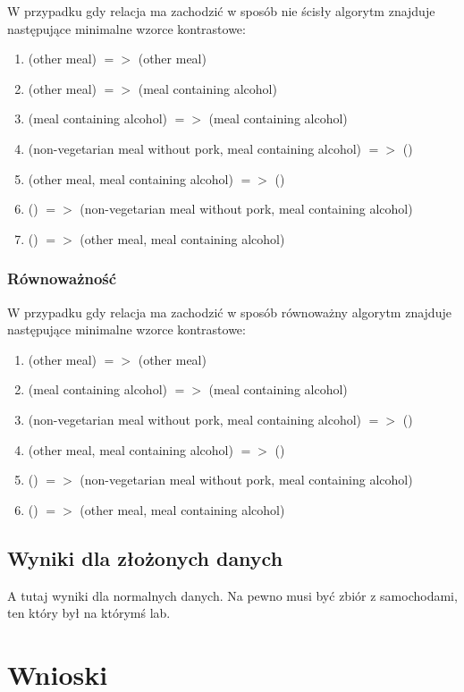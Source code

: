 \documentclass[a4paper,12pt]{article}
\begin{document}
W przypadku gdy relacja ma zachodzić w sposób nie ścisły algorytm znajduje następujące minimalne wzorce kontrastowe:

\begin{enumerate}
\item (other meal) $=>$ (other meal)
\item (other meal) $=>$ (meal containing alcohol)
\item (meal containing alcohol) $=>$ (meal containing alcohol)
\item (non-vegetarian meal without pork, meal containing alcohol) $=>$ ()
\item (other meal, meal containing alcohol) $=>$ ()
\item () $=>$ (non-vegetarian meal without pork, meal containing alcohol)
\item () $=>$ (other meal, meal containing alcohol)
\end{enumerate}

\subsubsection{Równoważność}

W przypadku gdy relacja ma zachodzić w sposób równoważny algorytm znajduje następujące minimalne wzorce kontrastowe:

\begin{enumerate}
\item (other meal) $=>$ (other meal)
\item (meal containing alcohol) $=>$ (meal containing alcohol)
\item (non-vegetarian meal without pork, meal containing alcohol) $=>$ ()
\item (other meal, meal containing alcohol) $=>$ ()
\item () $=>$ (non-vegetarian meal without pork, meal containing alcohol)
\item () $=>$ (other meal, meal containing alcohol)
\end{enumerate}

\subsection{Wyniki dla złożonych danych}

A tutaj wyniki dla normalnych danych. Na pewno musi być zbiór z samochodami, ten który był na którymś lab.

\section{Wnioski}
\end{document}
